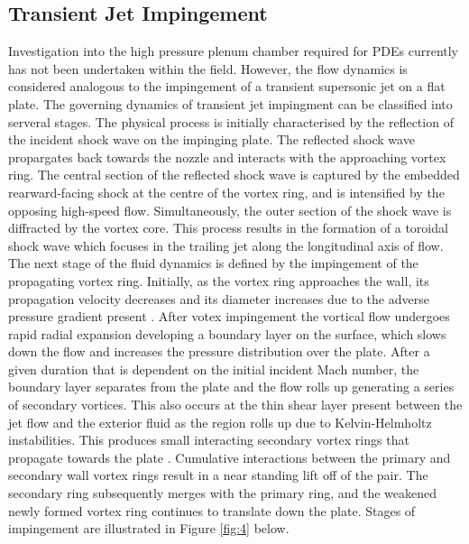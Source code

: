 \subsection{Transient Jet Impingement}
Investigation into the high pressure plenum chamber required for PDEs currently has not been undertaken within the field. However, the flow dynamics is considered analogous to the impingement of a transient supersonic jet on a flat plate. The governing dynamics of transient jet impingment can be classified into serveral stages. The physical process is initially characterised by the reflection of the incident shock wave on the impinging plate. The reflected shock wave propargates back towards the nozzle and interacts with the approaching vortex ring. The central section of the reflected shock wave is captured by the embedded rearward-facing shock at the centre of the vortex ring, and is intensified by the opposing high-speed flow. Simultaneously, the outer section of the shock wave is diffracted by the vortex core. This process results in the formation of a toroidal shock wave which focuses in the trailing jet along the longitudinal axis of flow. The next stage of the fluid dynamics is defined by the impingement of the propagating vortex ring. Initially, as the vortex ring approaches the wall, its propagation velocity decreases and its diameter increases due to the adverse pressure gradient present \citep{szumowski2000starting}. After votex impingement the vortical flow undergoes rapid radial expansion developing a boundary layer on the surface, which slows down the flow and increases the pressure distribution over the plate. After a given duration that is dependent on the initial incident Mach number, the boundary layer separates from the plate and the flow rolls up generating a series of secondary vortices. This also occurs at the thin shear layer present between the jet flow and the exterior fluid as the region rolls up due to Kelvin-Helmholtz instabilities. This produces small interacting secondary vortex rings that propagate towards the plate \citep{minota1997shock}. Cumulative interactions between the primary and secondary wall vortex rings result in a near standing lift off of the pair. The secondary ring subsequently merges with the primary ring, and the weakened newly formed vortex ring continues to translate down the plate. Stages of impingement are illustrated in Figure \ref{fig:4} below.

